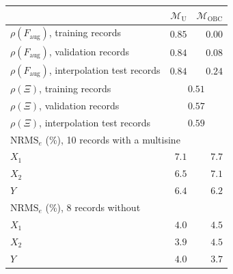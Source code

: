 \setlength{\tabcolsep}{4pt}
\begin{tabular}{l r r}
\toprule
 & $\mathcal{M}_{\mathrm{U}}$ & $\mathcal{M}_{\mathrm{OBC}}$\\
\midrule
$\rho(F_{\mathrm{aug}})$, training records & $0.85$ & $0.00$\\
$\rho(F_{\mathrm{aug}})$, validation records & $0.84$ & $0.08$\\
$\rho(F_{\mathrm{aug}})$, interpolation test records & $0.84$ & $0.24$\\
$\rho(\Xi)$, training records & \multicolumn{2}{c}{$0.51$}\\
$\rho(\Xi)$, validation records & \multicolumn{2}{c}{$0.57$}\\
$\rho(\Xi)$, interpolation test records & \multicolumn{2}{c}{$0.59$}\\
\midrule
\multicolumn{3}{l}{$\mathrm{NRMS}_e$ (\%), 10 records with a multisine}\\
$X_1$ & $7.1$ & $7.7$\\
$X_2$ & $6.5$ & $7.1$\\
$Y$ & $6.4$ & $6.2$\\
\midrule
\multicolumn{3}{l}{$\mathrm{NRMS}_e$ (\%), 8 records without}\\
$X_1$ & $4.0$ & $4.5$\\
$X_2$ & $3.9$ & $4.5$\\
$Y$ & $4.0$ & $3.7$\\
\bottomrule
\end{tabular}
